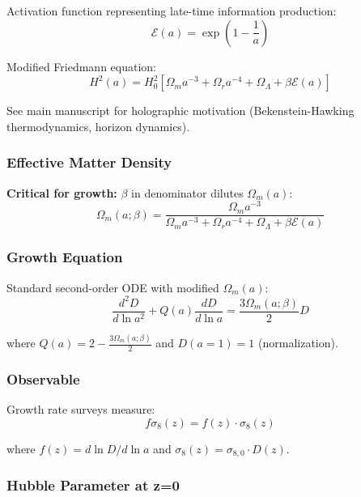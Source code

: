 \documentclass[11pt]{article}
\begin{document}
Activation function representing late-time information production:
\begin{equation}
\mathcal{E}(a) = \exp\left(1 - \frac{1}{a}\right)
\end{equation}

Modified Friedmann equation:
\begin{equation}
H^2(a) = H_0^2\left[\Omega_m a^{-3} + \Omega_r a^{-4} + \Omega_\Lambda + \beta \mathcal{E}(a)\right]
\end{equation}

\noindent See main manuscript for holographic motivation (Bekenstein-Hawking thermodynamics, horizon dynamics).

\subsubsection{Effective Matter Density}

\textbf{Critical for growth:} $\beta$ in denominator dilutes $\Omega_m(a)$:
\begin{equation}
\Omega_m(a; \beta) = \frac{\Omega_m a^{-3}}{\Omega_m a^{-3} + \Omega_r a^{-4} + \Omega_\Lambda + \beta \mathcal{E}(a)}
\end{equation}

\subsubsection{Growth Equation}

Standard second-order ODE with modified $\Omega_m(a)$:
\begin{equation}
\frac{d^2 D}{d\ln a^2} + Q(a) \frac{dD}{d\ln a} = \frac{3\Omega_m(a; \beta)}{2} D
\end{equation}

where $Q(a) = 2 - \frac{3\Omega_m(a; \beta)}{2}$ and $D(a=1) = 1$ (normalization).

\subsubsection{Observable}

Growth rate surveys measure:
\begin{equation}
f\sigma_8(z) = f(z) \cdot \sigma_8(z)
\end{equation}

where $f(z) = d \ln D / d \ln a$ and $\sigma_8(z) = \sigma_{8,0} \cdot D(z)$.

\subsubsection{Hubble Parameter at z=0}
\end{document}

